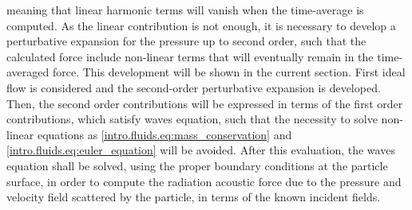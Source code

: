 meaning that linear harmonic terms will vanish when the time-average is computed. As the linear contribution is not enough, it is necessary to develop a perturbative expansion for the pressure up to second order, such that the calculated force include non-linear terms that will eventually remain in the time-averaged force. This development will be shown in the current section. First ideal flow is considered and the second-order perturbative expansion is developed. Then, the second order contributions will be expressed in terms of the first order contributions, which satisfy waves equation, such that the necessity to solve non-linear equations as \ref{intro.fluids.eq:mass_conservation} and \ref{intro.fluids.eq:euler_equation} will be avoided. After this evaluation, the waves equation shall be solved, using the proper boundary conditions at the particle surface, in order to compute the radiation acoustic force due to the pressure and velocity field scattered by the particle, in terms of the known incident fields.
